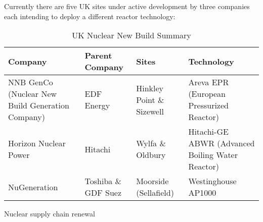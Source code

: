 Currently there are five UK sites under active development by three companies each intending to deploy a different reactor technology:
\begin{table}[!htb]
\caption{UK Nuclear New Build Summary}
\label{table:NNB}
\begin{center}
\begin{tabular}{p{}p{}p{}p{}}
\toprule
\textbf{Company} 		&	\textbf{Parent Company}	& 	\textbf{Sites} 	& 	\textbf{Technology} \\ \toprule
NNB GenCo (Nuclear New Build Generation Company)&EDF Energy & Hinkley Point \& Sizewell&Areva EPR (European Pressurized Reactor)\\
Horizon Nuclear Power&Hitachi& Wylfa \& Oldbury& Hitachi-GE ABWR (Advanced Boiling Water Reactor)\\
NuGeneration&Toshiba \& GDF Suez&Moorside (Sellafield)&Westinghouse AP1000\\
\bottomrule
\end{tabular}
\end{center}
\end{table}

 

Nuclear supply chain renewal
